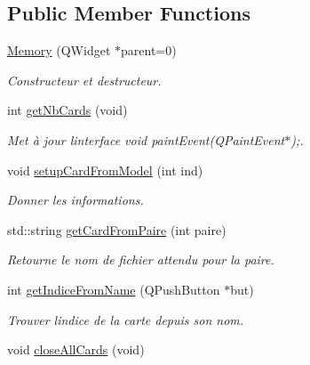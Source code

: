 \subsection*{Public Member Functions}
\begin{DoxyCompactItemize}
\item 
\hyperlink{class_memory_a243eef3e0fd8d02131e3bcca0471c931}{Memory} (Q\+Widget $\ast$parent=0)
\begin{DoxyCompactList}\small\item\em Constructeur et destructeur. \end{DoxyCompactList}\item 
int \hyperlink{class_memory_a7c8b57775899a3782edcdf4da430ad61}{get\+Nb\+Cards} (void)
\begin{DoxyCompactList}\small\item\em Met à jour l\textquotesingle{}interface  void paint\+Event(\+Q\+Paint\+Event$\ast$);. \end{DoxyCompactList}\item 
void \hyperlink{class_memory_a296d041ffa5698d725cbf34257c8aeb3}{setup\+Card\+From\+Model} (int ind)
\begin{DoxyCompactList}\small\item\em Donner les informations. \end{DoxyCompactList}\item 
\mbox{\label{class_memory_a21ee675074812b4fb7b56dd6795b229c}} 
std\+::string \hyperlink{class_memory_a21ee675074812b4fb7b56dd6795b229c}{get\+Card\+From\+Paire} (int paire)
\begin{DoxyCompactList}\small\item\em Retourne le nom de fichier attendu pour la paire. \end{DoxyCompactList}\item 
\mbox{\label{class_memory_a162c70bd9a89e92e601c68ae51d78159}} 
int \hyperlink{class_memory_a162c70bd9a89e92e601c68ae51d78159}{get\+Indice\+From\+Name} (Q\+Push\+Button $\ast$but)
\begin{DoxyCompactList}\small\item\em Trouver l\textquotesingle{}indice de la carte depuis son nom. \end{DoxyCompactList}\item 
\mbox{\label{class_memory_a8b2e64de3708d9ddf397517a668d813d}} 
void \hyperlink{class_memory_a8b2e64de3708d9ddf397517a668d813d}{close\+All\+Cards} (void)

\end{DoxyCompactItemize}
